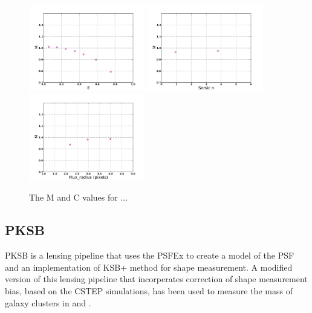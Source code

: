 \begin{figure}
\centering
\includegraphics[width=0.45\textwidth]{fig/MvaleKM.pdf} 
\includegraphics[width=0.45\textwidth]{fig/Mval_typeKM.pdf} 
\includegraphics[width=0.45\textwidth]{fig/Mval_sizeKM.pdf} 
\caption{The M and C values for ...}
\label{fig:DEIMOS_m}
\end{figure}

\newpage 
\subsection{PKSB}
PKSB is a lensing pipeline that uses the PSFEx \cite{PSFex}
to create a model of the PSF and an implementation of KSB+ method 
for shape measurement. A modified version of this lensing pipeline
that incorperates correction of shape measurement bias, based on the
CSTEP simulations, has been used to measure the mass of galaxy
clusters in \cite{Gruen_s} and \cite{Gruen2}. \\
 

